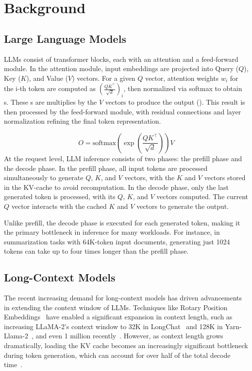 \section{Background}
\subsection{Large Language Models}



LLMs consist of transformer blocks, each with an attention and a feed-forward module. In the attention module, input embeddings are projected into Query ($Q$), Key ($K$), and Value ($V$) vectors. For a given $Q$ vector, attention weights  $w_i$ for the i-th token are computed as $(\frac{QK^\top}{\sqrt{d}})_i$, then normalized via softmax to obtain \as{}s. These \as{}s are multiplies by the $V$ vectors to produce the output (). This result is then processed by the feed-forward module, with residual connections and layer normalization refining the final token representation.

\begin{equation}
    \label{eq:attn}
    O=\text{softmax}\left(\exp\left(\frac{QK^\top}{\sqrt{d}}\right)\right)V
\end{equation}
At the request level, LLM inference consists of two phases: the prefill phase and the decode phase. In the prefill phase, all input tokens are processed simultaneously to generate $Q$, $K$, and $V$ vectors, with the $K$ and $V$ vectors stored in the KV-cache to avoid recomputation. In the decode phase, only the last generated token is processed, with its  $Q$, $K$, and $V$ vectors computed. The current $Q$ vector interacts with the cached $K$ and $V$ vectors to generate the output.

Unlike prefill, the decode phase is executed for each generated token, making it the primary bottleneck in inference for many workloads. For instance, in summarization tasks with 64K-token input documents, generating just 1024 tokens can take up to four times longer than the prefill phase.  

\subsection{Long-Context Models}

The recent increasing demand for long-context models has driven advancements in extending the context window of LLMs. Techniques like Rotary Position Embeddings~\cite{su2023roformerenhancedtransformerrotary} have enabled a significant expansion in context length, such as increasing LLaMA-2's context window to 32K in LongChat~\cite{longchat2023} and 128K in Yarn-Llama-2~\cite{peng2023yarn}, and even 1 million recently~\cite{liu2024scalinglawsropebasedextrapolation}. However, as context length grows dramatically, loading the KV cache becomes an increasingly significant bottleneck during token generation, which can account for over half of the total decode time~\cite{tang2024questqueryawaresparsityefficient}.

